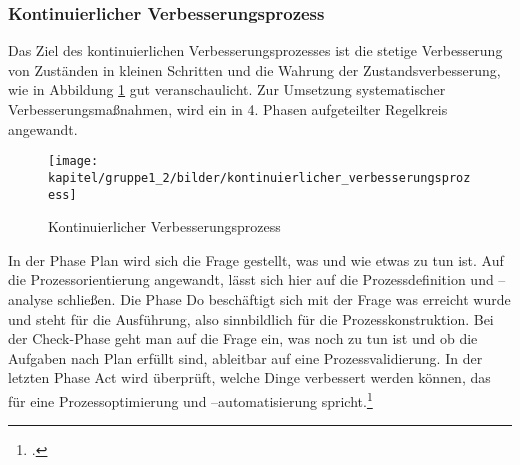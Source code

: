 \subsubsection{Kontinuierlicher Verbesserungsprozess}
\label{subsubsection_kontinuierlicher_verbesserungsprozess}
Das Ziel des kontinuierlichen Verbesserungsprozesses ist die stetige Verbesserung von Zuständen in 
kleinen Schritten und die Wahrung der  Zustandsverbesserung, wie in Abbildung 
\ref{fig_kontinuierliche_verbesserung} gut veranschaulicht. Zur Umsetzung systematischer 
Verbesserungsmaßnahmen, wird ein in 4. Phasen aufgeteilter Regelkreis angewandt.

\begin{figure}[h!]
	\centering
	\texttt{[image: kapitel/gruppe1\_2/bilder/kontinuierlicher\_verbesserungsprozess]} 
	\caption{Kontinuierlicher Verbesserungsprozess\protect\footnotemark}
	\label{fig_kontinuierliche_verbesserung}
\end{figure}


In der Phase Plan wird sich die Frage gestellt, was und wie etwas zu tun ist. Auf die Prozessorientierung angewandt, lässt sich hier auf die Prozessdefinition und –analyse schließen. Die Phase Do beschäftigt sich mit der Frage was erreicht wurde und steht für die Ausführung, also sinnbildlich für die Prozesskonstruktion. Bei der Check-Phase geht man auf die Frage ein, was noch zu tun ist und ob die Aufgaben nach Plan erfüllt sind, ableitbar auf eine Prozessvalidierung. In der letzten Phase Act wird überprüft, welche Dinge verbessert werden können, das für eine Prozessoptimierung und –automatisierung spricht.\footcite[Vgl.]{yasar_kvp_2015}


